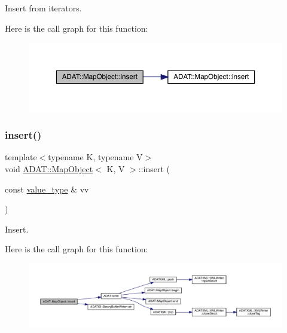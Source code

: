 Insert from iterators. 

Here is the call graph for this function\+:
\nopagebreak
\begin{figure}[H]
\begin{center}
\leavevmode
\includegraphics[width=350pt]{da/d29/classADAT_1_1MapObject_a151aa826b6db5cd124ed13f4a293da2b_cgraph}
\end{center}
\end{figure}
\mbox{\label{classADAT_1_1MapObject_aaa819ee6219acf8f74c39563c9c68ab4}} 
\subsubsection{\texorpdfstring{insert()}{insert()}\hspace{0.1cm}{\footnotesize\ttfamily [7/9]}}
{\footnotesize\ttfamily template$<$typename K, typename V$>$ \\
void \mbox{\hyperlink{classADAT_1_1MapObject}{A\+D\+A\+T\+::\+Map\+Object}}$<$ K, V $>$\+::insert (\begin{DoxyParamCaption}\item[{const \mbox{\hyperlink{classADAT_1_1MapObject_ad985e6ff5b35a72c79d4b466d316cc0a}{value\+\_\+type}} \&}]{vv }\end{DoxyParamCaption})\hspace{0.3cm}{\ttfamily [inline]}}



Insert. 

Here is the call graph for this function\+:
\nopagebreak
\begin{figure}[H]
\begin{center}
\leavevmode
\includegraphics[width=350pt]{da/d29/classADAT_1_1MapObject_aaa819ee6219acf8f74c39563c9c68ab4_cgraph}
\end{center}
\end{figure}
\mbox{\label{classADAT_1_1MapObject_aaa819ee6219acf8f74c39563c9c68ab4}} 
